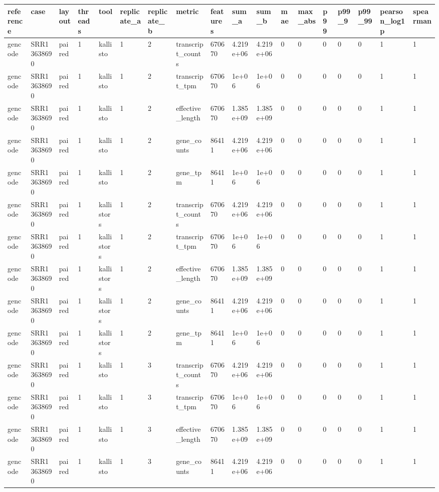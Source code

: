 \begin{tabular}{llllllllllllllllll}
\toprule
reference & case & layout & threads & tool & replicate\_a & replicate\_b & metric & features & sum\_a & sum\_b & mae & max\_abs & p99 & p99\_9 & p99\_99 & pearson\_log1p & spearman \\
\midrule
gencode & SRR13638690 & paired & 1 & kallisto & 1 & 2 & transcript\_counts & 670670 & 4.219e+06 & 4.219e+06 & 0 & 0 & 0 & 0 & 0 & 1 & 1 \\
gencode & SRR13638690 & paired & 1 & kallisto & 1 & 2 & transcript\_tpm & 670670 & 1e+06 & 1e+06 & 0 & 0 & 0 & 0 & 0 & 1 & 1 \\
gencode & SRR13638690 & paired & 1 & kallisto & 1 & 2 & effective\_length & 670670 & 1.385e+09 & 1.385e+09 & 0 & 0 & 0 & 0 & 0 & 1 & 1 \\
gencode & SRR13638690 & paired & 1 & kallisto & 1 & 2 & gene\_counts & 86411 & 4.219e+06 & 4.219e+06 & 0 & 0 & 0 & 0 & 0 & 1 & 1 \\
gencode & SRR13638690 & paired & 1 & kallisto & 1 & 2 & gene\_tpm & 86411 & 1e+06 & 1e+06 & 0 & 0 & 0 & 0 & 0 & 1 & 1 \\
gencode & SRR13638690 & paired & 1 & kallistors & 1 & 2 & transcript\_counts & 670670 & 4.219e+06 & 4.219e+06 & 0 & 0 & 0 & 0 & 0 & 1 & 1 \\
gencode & SRR13638690 & paired & 1 & kallistors & 1 & 2 & transcript\_tpm & 670670 & 1e+06 & 1e+06 & 0 & 0 & 0 & 0 & 0 & 1 & 1 \\
gencode & SRR13638690 & paired & 1 & kallistors & 1 & 2 & effective\_length & 670670 & 1.385e+09 & 1.385e+09 & 0 & 0 & 0 & 0 & 0 & 1 & 1 \\
gencode & SRR13638690 & paired & 1 & kallistors & 1 & 2 & gene\_counts & 86411 & 4.219e+06 & 4.219e+06 & 0 & 0 & 0 & 0 & 0 & 1 & 1 \\
gencode & SRR13638690 & paired & 1 & kallistors & 1 & 2 & gene\_tpm & 86411 & 1e+06 & 1e+06 & 0 & 0 & 0 & 0 & 0 & 1 & 1 \\
gencode & SRR13638690 & paired & 1 & kallisto & 1 & 3 & transcript\_counts & 670670 & 4.219e+06 & 4.219e+06 & 0 & 0 & 0 & 0 & 0 & 1 & 1 \\
gencode & SRR13638690 & paired & 1 & kallisto & 1 & 3 & transcript\_tpm & 670670 & 1e+06 & 1e+06 & 0 & 0 & 0 & 0 & 0 & 1 & 1 \\
gencode & SRR13638690 & paired & 1 & kallisto & 1 & 3 & effective\_length & 670670 & 1.385e+09 & 1.385e+09 & 0 & 0 & 0 & 0 & 0 & 1 & 1 \\
gencode & SRR13638690 & paired & 1 & kallisto & 1 & 3 & gene\_counts & 86411 & 4.219e+06 & 4.219e+06 & 0 & 0 & 0 & 0 & 0 & 1 & 1 \\

\end{tabular}
